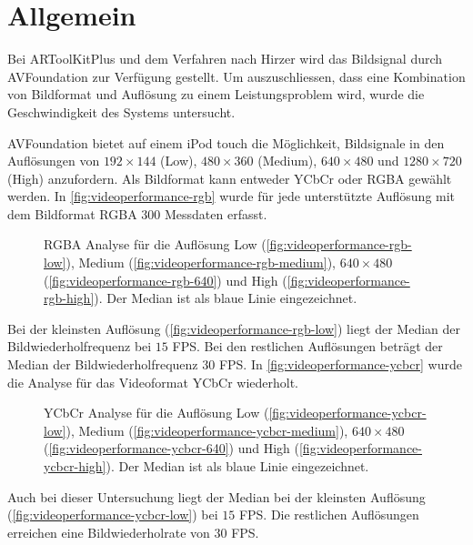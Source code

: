 \section{Allgemein} %
\label{sec:allgemein}

Bei ARToolKitPlus und dem Verfahren nach Hirzer wird das Bildsignal durch AVFoundation zur Verfügung gestellt. Um
 auszuschliessen, dass eine Kombination von Bildformat und Auflösung zu einem Leistungsproblem wird, wurde die
 Geschwindigkeit des Systems untersucht.

AVFoundation bietet auf einem iPod touch die Möglichkeit, Bildsignale in den Auflösungen von $192 \times 144$ (Low),
 $480 \times 360$ (Medium), $640 \times 480$ und $1280 \times 720$ (High) anzufordern. Als Bildformat kann entweder
 YCbCr oder RGBA gewählt werden. In \autoref{fig:videoperformance-rgb} wurde für jede unterstützte
 Auflösung mit dem Bildformat RGBA $300$ Messdaten erfasst.
\begin{figure}[!ht]
	\centering
	\caption{RGBA Analyse für die Auflösung Low (\autoref{fig:videoperformance-rgb-low}),
	 Medium (\autoref{fig:videoperformance-rgb-medium}), $640 \times 480$ (\autoref{fig:videoperformance-rgb-640}) und
	 High (\autoref{fig:videoperformance-rgb-high}). Der Median ist als blaue Linie eingezeichnet.}
	\label{fig:videoperformance-rgb}
\end{figure}
Bei der kleinsten Auflösung (\autoref{fig:videoperformance-rgb-low}) liegt der Median der Bildwiederholfrequenz bei $15$
 FPS. Bei den restlichen Auflösungen beträgt der Median der Bildwiederholfrequenz $30$ FPS. In
 \autoref{fig:videoperformance-ycbcr} wurde die Analyse für das Videoformat YCbCr wiederholt.
\begin{figure}[!ht]
	\centering
	\caption{YCbCr Analyse für die Auflösung Low (\autoref{fig:videoperformance-ycbcr-low}),
	 Medium (\autoref{fig:videoperformance-ycbcr-medium}), $640 \times 480$ (\autoref{fig:videoperformance-ycbcr-640})
	 und High (\autoref{fig:videoperformance-ycbcr-high}). Der Median ist als blaue Linie eingezeichnet.}
	\label{fig:videoperformance-ycbcr}
\end{figure}
Auch bei dieser Untersuchung liegt der Median bei der kleinsten Auflösung (\autoref{fig:videoperformance-ycbcr-low})
 bei $15$ FPS. Die restlichen Auflösungen erreichen eine Bildwiederholrate von $30$ FPS.

